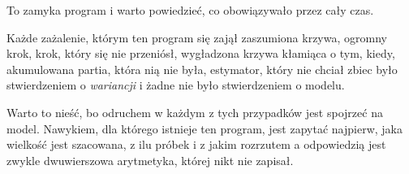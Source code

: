 \begin{fr}
To zamyka program i warto powiedzieć, co obowiązywało przez cały czas.

Każde zażalenie, którym ten program się zajął \dash{} zaszumiona krzywa,
ogromny krok, krok, który się nie przeniósł, wygładzona krzywa kłamiąca o tym,
kiedy, akumulowana partia, która nią nie była, estymator, który nie chciał
zbiec \dash{} było stwierdzeniem o \emph{wariancji} i żadne nie było
stwierdzeniem o modelu.

Warto to nieść, bo odruchem w każdym z tych przypadków jest spojrzeć na model.
Nawykiem, dla którego istnieje ten program, jest zapytać najpierw, jaka wielkość
jest szacowana, z ilu próbek i z jakim rozrzutem \dash{} a odpowiedzią jest
zwykle dwuwierszowa arytmetyka, której nikt nie zapisał.
\end{fr}


